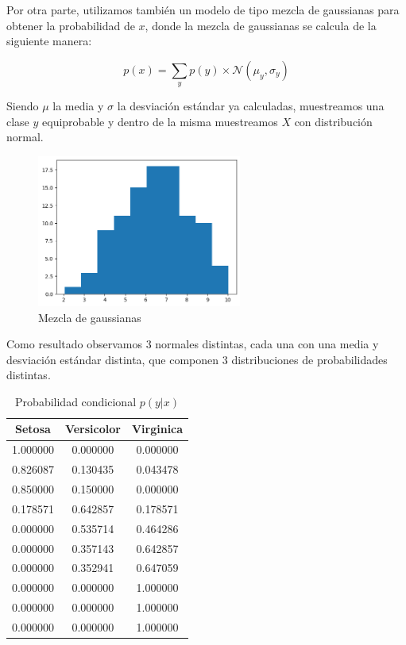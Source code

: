 \documentclass[11pt]{article}
\begin{document}
Por otra parte, utilizamos también un modelo de tipo mezcla de gaussianas para obtener la probabilidad de $x$, donde la mezcla de gaussianas se calcula de la siguiente manera:

$$
p(x) = \sum_y p(y) \times \mathcal{N}(\mu_y, \sigma_y)
$$ 

Siendo $\mu$ la media y $\sigma$ la desviación estándar ya calculadas, muestreamos una clase $y$ equiprobable y dentro de la misma muestreamos $X$ con distribución normal. 

\begin{figure}[h]
    \centering
    \includegraphics[width=0.6\textwidth]{notebooks_clase_1/mix_gaussians.png}
    \caption{Mezcla de gaussianas}
    \label{fig:mix-gaussians}
\end{figure}

Como resultado observamos 3 normales distintas, cada una con una media y desviación estándar distinta, que componen 3 distribuciones de probabilidades distintas. 

\begin{table}[h]
\centering
\begin{tabular}{c|c|c}
\textbf{Setosa}                   & \textbf{Versicolor}               &  \textbf{Virginica} \\ \hline \hline
        1.000000 & 0.000000 & 0.000000 \\
        0.826087 & 0.130435 & 0.043478 \\
        0.850000 & 0.150000 & 0.000000 \\
        0.178571 & 0.642857 & 0.178571 \\
        0.000000 & 0.535714 & 0.464286 \\
        0.000000 & 0.357143 & 0.642857 \\
        0.000000 & 0.352941 & 0.647059 \\
        0.000000 & 0.000000 & 1.000000 \\
        0.000000 & 0.000000 & 1.000000 \\
        0.000000 & 0.000000 & 1.000000 \\
    \end{tabular}
    \caption{Probabilidad condicional $p(y|x)$}
    \label{tab:my_label}
\end{table}
\end{document}
